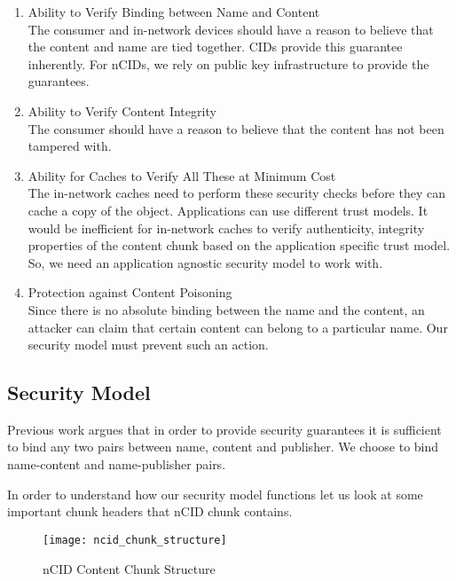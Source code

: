 \begin{enumerate}
\item{Ability to Verify Binding between Name and Content} \\
The consumer and in-network devices should have a reason to believe
that the content and name are tied together. CIDs provide this
guarantee inherently. For nCIDs, we rely on public key infrastructure
to provide the guarantees.
\item{Ability to Verify Content Integrity} \\
The consumer should have a reason to believe that the content has not
been tampered with.
\item{Ability for Caches to Verify All These at Minimum Cost}\\
The in-network caches need to perform these security checks before
they can cache a copy of the object. Applications can use different
trust models. It would be inefficient for in-network caches to verify
authenticity, integrity properties of the content chunk based on the
application specific trust model. So, we need an application agnostic
security model to work with.
\item{Protection against Content Poisoning} \\
Since there is no absolute binding between the name and the content,
an attacker can claim that certain content can belong to a particular
name. Our security model must prevent such an action.
\end{enumerate}
\subsection{Security Model}

Previous work argues that in order to provide security guarantees it
is sufficient to bind any two pairs between name, content and
publisher. We choose to bind name-content and name-publisher pairs.

In order to understand how our security model functions let us look at
some important chunk headers that nCID chunk contains.

\begin{figure}
  \begin{center}
    \texttt{[image: ncid\_chunk\_structure]}
    \caption{nCID Content Chunk Structure}
    \label{fig:ncid_chunk_structure}
  \end{center}
\end{figure}


